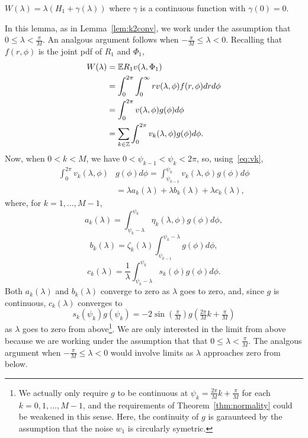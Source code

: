 \documentclass[journal]{IEEEtran}
\begin{document}
\begin{lemma}\label{lem:expRvlamphi}
$W(\lambda) =  \lambda(H_1 + \gamma(\lambda))$ where $\gamma$ is a continuous function with $\gamma(0) = 0$.
\end{lemma}
\begin{IEEEproof}
In this lemma, as in Lemma~\ref{lem:k2conv}, we work under the assumption that $0 \leq \lambda < \frac{\pi}{M}$.  An analgous argument follows when $-\tfrac{\pi}{M} \leq \lambda < 0$.  Recalling that $f(r,\phi)$ is the joint pdf of $R_1$ and $\Phi_1$, 
\begin{align}
W(\lambda) &= {\mathbb E} R_1 v(\lambda, \Phi_1) \nonumber  \\
&= \int_0^{2\pi}\int_{0}^\infty r v(\lambda, \phi) f(r,\phi) dr d\phi \nonumber  \\ 
&= \int_0^{2\pi} v(\lambda, \phi) g(\phi) d\phi \nonumber \\
&= \sum_{k \in {\mathbb Z}} \int_0^{2\pi} v_k(\lambda, \phi) g(\phi) d\phi. \label{eq:Winfsum}
\end{align}
Now, when $0 < k < M$, we have $0 < \psi_{k-1} < \psi_k < 2\pi$, so, using~\eqref{eq:vk},
\begin{align*}
\int_0^{2\pi} v_k(\lambda, \phi) &g(\phi) d\phi = \int_{\psi_{k-1}}^{\psi_{k}} v_k(\lambda, \phi) g(\phi) d\phi \\
&= \lambda a_k(\lambda) + \lambda b_k(\lambda) + \lambda c_k(\lambda),
\end{align*}
where, for $k = 1, \dots, M-1$,
\begin{equation}\label{eq:ak}
a_k(\lambda) = \int_{\psi_k-\lambda}^{\psi_k}\eta_k(\lambda, \phi) g(\phi) d\phi,
\end{equation}
\[
b_k(\lambda) = \zeta_k(\lambda) \int_{\psi_{k-1}}^{\psi_k -\lambda}g(\phi) d\phi,
\]
\begin{equation}\label{eq:ck}
c_k(\lambda) = \frac{1}{\lambda} \int_{\psi_{k} - \lambda}^{\psi_{k}} s_k(\phi) g(\phi) d\phi.
\end{equation}
Both $a_k(\lambda)$ and $b_k(\lambda)$ converge to zero as $\lambda$ goes to zero, and, since $g$ is continuous, $c_k(\lambda)$ converges to 
\[
s_k(\psi_k)g(\psi_k) = -2\sin(\tfrac{\pi}{M}) g(\tfrac{2\pi}{M}k + \tfrac{\pi}{M})
\]
as $\lambda$ goes to zero from above\footnote{We actually only require $g$ to be continuous at $\psi_k = \tfrac{2\pi}{M}k + \tfrac{\pi}{M}$ for each $k = 0, 1, \dots, M-1$, and the requirements of Theorem~\ref{thm:normality} could be weakened in this sense.  Here, the continuity of $g$ is garaunteed by the assumption that the noise $w_1$ is circularly symetric.}.  We are only interested in the limit from above because we are working under the assumption that that $0 \leq \lambda < \frac{\pi}{M}$.  The analgous argument when $-\tfrac{\pi}{M} \leq \lambda < 0$ would involve limits as $\lambda$ approaches zero from below.


\end{IEEEproof}
\end{document}
